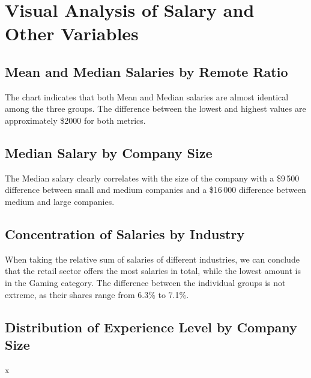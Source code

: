 \documentclass[12pt, a4paper, titlepage]{article}
\begin{document}
\section{Visual Analysis of Salary and Other Variables}
\subsection{Mean and Median Salaries by Remote Ratio}
The chart indicates that both Mean and Median salaries are almost identical among the three groups. The difference between the lowest and highest values are approximately \$2000 for both metrics.

\subsection{Median Salary by Company Size}
The Median salary clearly correlates with the size of the company with a \$9\,500 difference between small and medium companies and a \$16\,000 difference between medium and large companies.

\subsection{Concentration of Salaries by Industry}
When taking the relative sum of salaries of different industries, we can conclude that the retail sector offers the most salaries in total, while the lowest amount is in the Gaming category. The difference between the individual groups is not extreme, as their shares range from 6.3\% to 7.1\%.

\subsection{Distribution of Experience Level by Company Size}x
\end{document}
